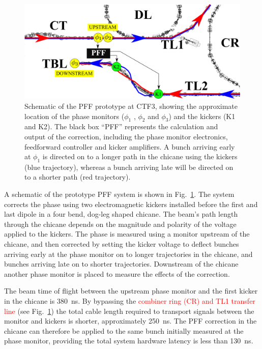 \documentclass[%
 reprint,
superscriptaddress,
 amsmath,amssymb,
 prl,
]{revtex4-1}
\begin{document}

\begin{figure}
	\includegraphics[width=\columnwidth]{figs/ctfpffLayout}%
	\caption{\label{fig:pffLayout}Schematic of the PFF prototype at CTF3, 
	showing the approximate location of the phase monitors (\(\phi_1\) , 
	\(\phi_2\) and \(\phi_3\)) and
		the kickers (K1 and K2). The black box “PFF” represents the calculation 
		and output of the correction, including the phase monitor
		electronics, feedforward controller and kicker amplifiers. A bunch 
		arriving early at \(\phi_1\) is directed on to a longer path in the
		chicane
		using the kickers (blue trajectory), whereas a bunch arriving late will 
		be directed on to a shorter path (red trajectory). }
\end{figure}

A schematic of the prototype PFF system is shown in Fig.~\ref{fig:pffLayout}. 
The system corrects the phase using two electromagnetic kickers installed 
before the first and last dipole in a four bend, dog-leg shaped chicane. The 
beam's path length through the chicane depends on the magnitude and polarity of 
the voltage applied to the kickers. The phase is measured using a monitor 
upstream of the chicane, and then corrected by setting the kicker voltage to 
deflect bunches arriving early at the phase monitor on to longer trajectories 
in the chicane, and bunches arriving late on to shorter trajectories. 
Downstream of the chicane another phase monitor is placed to measure the 
effects of the correction.

The beam time of flight between the upstream phase monitor and the first kicker 
in the chicane is 380~ns. By bypassing the \textcolor{red}{combiner ring (CR) 
and TL1 transfer 
line} (see Fig.~\ref{fig:pffLayout}) the total cable length required to 
transport signals between the monitor and kickers is shorter, approximately 
250~ns. The PFF correction in the chicane can therefore be applied to the same 
bunch initially measured at the phase monitor, providing the total system 
hardware latency is less than 130~ns. 
\end{document}
